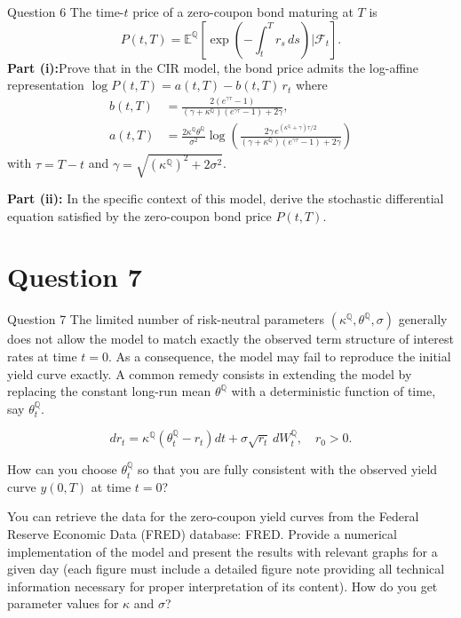 \documentclass[compress]{beamer}
\begin{document}
\begin{frame}[allowframebreaks]{Question 6}
     The time-$t$ price of a zero-coupon bond maturing at $T$ is
    \[
        P(t, T) = \mathbb{E}^{\mathbb{Q}}\left[\exp\left(-\int_t^T r_s\,ds\right)\bigg|\mathcal{F}_t\right].
    \]
    \textbf{Part (i):}Prove that in the CIR model, the bond price admits the log-affine representation $\log P(t,T) = a(t,T) - b(t,T)\,r_t$ where 
    \begin{align*}
        b(t,T) &= \frac{2(e^{\gamma\tau}-1)}{(\gamma+\kappa^{\mathbb{Q}})(e^{\gamma\tau}-1)+2\gamma}, \\
        a(t,T) &= \frac{2\kappa^{\mathbb{Q}}\theta^{\mathbb{Q}}}{\sigma^2}
        \log\left(\frac{2\gamma\, e^{(\kappa^{\mathbb{Q}}+\gamma)\tau/2}}{(\gamma+\kappa^{\mathbb{Q}})(e^{\gamma\tau}-1)+2\gamma}\right)
    \end{align*}
    with $\tau = T-t$ and $\gamma = \sqrt{(\kappa^{\mathbb{Q}})^2 + 2\sigma^2}$.
    
    \vspace{0.4em}
    \textbf{Part (ii):} In the specific context of this model, derive the stochastic differential equation satisfied by the zero-coupon bond price $P(t,T)$.
\end{frame}


\section{Question 7}

\begin{frame}[allowframebreaks]{Question 7}
    The limited number of risk-neutral parameters $(\kappa^{\mathbb{Q}}, \theta^{\mathbb{Q}}, \sigma)$ generally does not allow the model to match exactly the observed term structure of interest rates at time $t=0$. As a consequence, the model may fail to reproduce the initial yield curve exactly. A common remedy consists in extending the model by replacing the constant long-run mean $\theta^{\mathbb{Q}}$ with a deterministic function of time, say $\theta_t^{\mathbb{Q}}$.
    
    \[
        dr_t = \kappa^{\mathbb{Q}}\left(\theta^{\mathbb{Q}}_t - r_t\right)dt + \sigma\sqrt{r_t}\,dW_t^{\mathbb{Q}}, \quad r_0 > 0.
    \]
    
    How can you choose $\theta_t^{\mathbb{Q}}$ so that you are fully consistent with the observed yield curve $y(0,T)$ at time $t=0$?

    You can retrieve the data for the zero-coupon yield curves from the Federal Reserve Economic Data (FRED) database: FRED. Provide a numerical implementation of the model and present the results with relevant graphs for a given day (each figure must include a detailed figure note providing all technical information necessary for proper interpretation of its content). How do you get parameter values for $\kappa$ and $\sigma$?
\end{frame}
\end{document}
